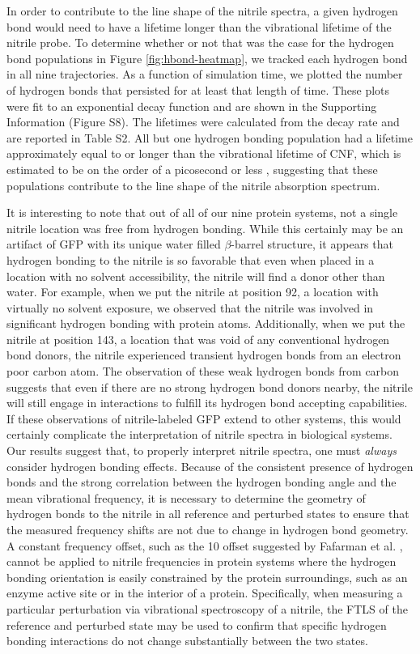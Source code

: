 In order to contribute to the line shape of the nitrile spectra, a given hydrogen bond would need to have a lifetime longer than the vibrational lifetime of the nitrile probe.
To determine whether or not that was the case for the hydrogen bond populations in Figure \ref{fig:hbond-heatmap}, we tracked each hydrogen bond in all nine trajectories.
As a function of simulation time, we plotted the number of hydrogen bonds that persisted for at least that length of time.
These plots were fit to an exponential decay function and are shown in the Supporting Information (Figure S8).
The lifetimes were calculated from the decay rate and are reported in Table S2.
All but one hydrogen bonding population had a lifetime approximately equal to or longer than the vibrational lifetime of CNF, which is estimated to be on the order of a picosecond or less \cite{Ghosh2009, Ha2009, Waegele2010}, suggesting that these populations contribute to the line shape of the nitrile absorption spectrum.

It is interesting to note that out of all of our nine protein systems, not a single nitrile location was free from hydrogen bonding.
While this certainly may be an artifact of GFP with its unique water filled $\beta$-barrel structure, it appears that hydrogen bonding to the nitrile is so favorable that even when placed in a location with no solvent accessibility, the nitrile will find a donor other than water.
For example, when we put the nitrile at position 92, a location with virtually no solvent exposure, we observed that the nitrile was involved in significant hydrogen bonding with protein atoms.
Additionally, when we put the nitrile at position 143, a location that was void of any conventional hydrogen bond donors, the nitrile experienced transient hydrogen bonds from an electron poor carbon atom.
The observation of these weak hydrogen bonds from carbon suggests that even if there are no strong hydrogen bond donors nearby, the nitrile will still engage in interactions to fulfill its hydrogen bond accepting capabilities.
If these observations of nitrile-labeled GFP extend to other systems, this would certainly complicate the interpretation of nitrile spectra in biological systems.
Our results suggest that, to properly interpret nitrile spectra, one must \emph{always} consider hydrogen bonding effects.
Because of the consistent presence of hydrogen bonds and the strong correlation between the hydrogen bonding angle and the mean vibrational frequency, it is necessary to determine the geometry of hydrogen bonds to the nitrile in all reference and perturbed states to ensure that the measured frequency shifts are not due to change in hydrogen bond geometry.
A constant frequency offset, such as the 10 \si{\wn} offset suggested by Fafarman et al. \cite{Fafarman2010}, cannot be applied to nitrile frequencies in protein systems where the hydrogen bonding orientation is easily constrained by the protein surroundings, such as an enzyme active site or in the interior of a protein.
Specifically, when measuring a particular perturbation via vibrational spectroscopy of a nitrile, the FTLS of the reference and perturbed state may be used to confirm that specific hydrogen bonding interactions do not change substantially between the two states.

